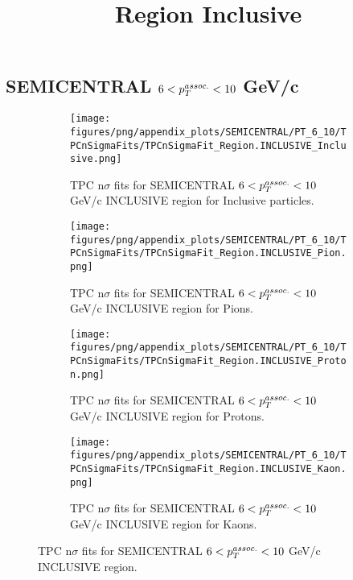     
            \subsection{SEMICENTRAL $6 < \pTassoc < 10$ GeV/c}
            \begin{figure}[H]
                \title{Region Inclusive}
                \begin{subfigure}[b]{0.5\textwidth}
                    \centering
                    \texttt{[image: figures/png/appendix\_plots/SEMICENTRAL/PT\_6\_10/TPCnSigmaFits/TPCnSigmaFit\_Region.INCLUSIVE\_Inclusive.png]}
                    \caption{TPC n$\sigma$ fits for SEMICENTRAL $6 < \pTassoc < 10$ GeV/c INCLUSIVE region for Inclusive particles.}
                    \label{fig:appendix_SEMICENTRAL_$6 < \pTassoc < 10$ GeV/c_INCLUSIVE_Inclusive}
                \end{subfigure}
                \begin{subfigure}[b]{0.5\textwidth}
                    \centering
                    \texttt{[image: figures/png/appendix\_plots/SEMICENTRAL/PT\_6\_10/TPCnSigmaFits/TPCnSigmaFit\_Region.INCLUSIVE\_Pion.png]}
                    \caption{TPC n$\sigma$ fits for SEMICENTRAL $6 < \pTassoc < 10$ GeV/c INCLUSIVE region for Pions.}
                    \label{fig:appendix_SEMICENTRAL_$6 < \pTassoc < 10$ GeV/c_INCLUSIVE_Pion}
                \end{subfigure}
                \begin{subfigure}[b]{0.5\textwidth}
                    \centering
                    \texttt{[image: figures/png/appendix\_plots/SEMICENTRAL/PT\_6\_10/TPCnSigmaFits/TPCnSigmaFit\_Region.INCLUSIVE\_Proton.png]}
                    \caption{TPC n$\sigma$ fits for SEMICENTRAL $6 < \pTassoc < 10$ GeV/c INCLUSIVE region for Protons.}
                    \label{fig:appendix_SEMICENTRAL_$6 < \pTassoc < 10$ GeV/c_INCLUSIVE_Proton}
                \end{subfigure}
                \begin{subfigure}[b]{0.5\textwidth}
                    \centering
                    \texttt{[image: figures/png/appendix\_plots/SEMICENTRAL/PT\_6\_10/TPCnSigmaFits/TPCnSigmaFit\_Region.INCLUSIVE\_Kaon.png]}
                    \caption{TPC n$\sigma$ fits for SEMICENTRAL $6 < \pTassoc < 10$ GeV/c INCLUSIVE region for Kaons.}
                    \label{fig:appendix_SEMICENTRAL_$6 < \pTassoc < 10$ GeV/c_INCLUSIVE_Kaon}
                \end{subfigure}
                \caption{TPC n$\sigma$ fits for SEMICENTRAL $6 < \pTassoc < 10$ GeV/c INCLUSIVE region.}
                \label{fig:appendix_SEMICENTRAL_$6 < \pTassoc < 10$ GeV/c_INCLUSIVE}
            \end{figure}
